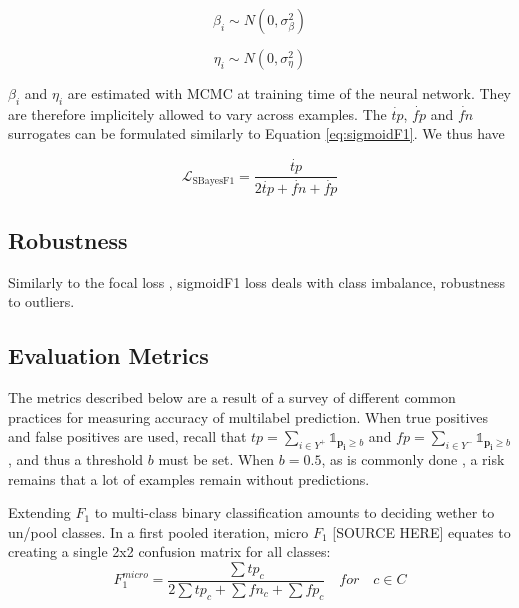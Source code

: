 $$ \beta_i \sim N(0, \sigma^{2}_{\beta}) $$

$$ \eta_i \sim N(0, \sigma^{2}_{\eta}) $$

\(\beta_i\) and \(\eta_i\) are estimated with MCMC at training time of the neural network. They are therefore implicitely allowed to vary across examples. The \(\dot{tp}\), \(\dot{fp}\) and \(\dot{fn}\) surrogates can be formulated similarly to Equation \ref{eq:sigmoidF1}. We thus have

\begin{equation}
\mathcal{L}_{\text {SBayesF1}}= \frac{\dot{tp}}{2 \dot{tp}+ \dot{fn}+ \dot{fp}}
\end{equation}





\subsection{Robustness}
\label{sec:org6c7c3d0}


Similarly to the focal loss \cite{focalLoss}, sigmoidF1 loss deals with class imbalance, robustness to outliers.




\subsection{Evaluation Metrics}
\label{sec:org23c8447}


The metrics described below are a result of a survey of different common practices for measuring accuracy of multilabel prediction. When true positives and false positives are used, recall that \(t p=\sum_{i \in Y^{+}} \mathds{1}_{\mathbf{p_i} \geq b}\) and \(f p=\sum_{i \in Y^{-}} \mathds{1}_{\mathbf{p_i} \geq b}\), and thus a threshold \(b\) must be set. When \(b = 0.5\), as is commonly done , a risk remains that a lot of examples remain without predictions.

Extending \(F_1\) to multi-class binary classification amounts to deciding wether to un/pool classes.
In a first pooled iteration, micro \(F_1\) [SOURCE HERE] equates to creating a single 2x2 confusion matrix for all classes:
$$F_1^{micro} = \frac{\sum tp_c}{2 \sum tp_c + \sum fn_c + \sum fp_c} \quad for \quad c \in C$$

